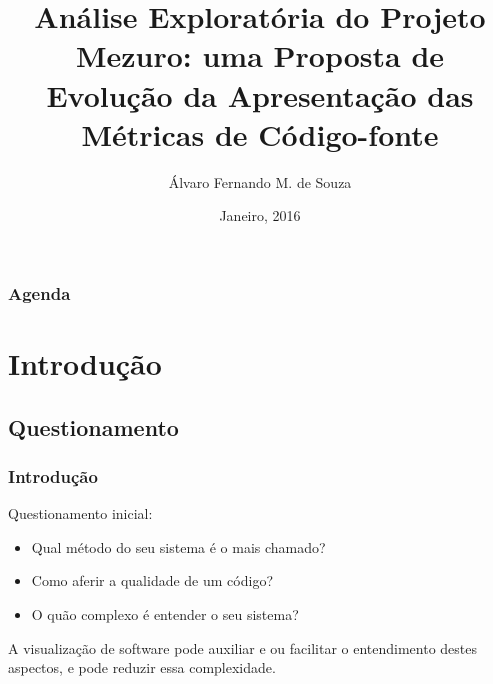 \documentclass{beamer}
\title[Análise Exploratória - Mezuro]{Análise Exploratória do Projeto
Mezuro: uma Proposta de Evoluç\~ao da Apresentaç\~ao das Métricas de
Código-fonte}
\author{Álvaro Fernando M. de Souza} %
\institute[UnB-FGA] %
{
Universidade de Brasília - Faculdade Gama \\ %
\medskip
\textit{alvarofernandoms@gmail.com} %
}
\date{Janeiro, 2016} %
\begin{document}
\begin{frame}
\titlepage %
\end{frame}

\begin{frame}
\frametitle{Agenda} %
\tableofcontents %
\end{frame}


\section{Introdução} %

\subsection{Questionamento}

\begin{frame}
\frametitle{Introdução}
Questionamento inicial: \\
\begin{itemize}
\item Qual método do seu sistema é o mais chamado?
\item Como aferir a qualidade de um código?
\item O quão complexo é entender o seu sistema?
\end{itemize}
A visualização de software pode auxiliar e ou facilitar o entendimento destes aspectos, e pode reduzir essa complexidade.
\end{frame}
\end{document}
